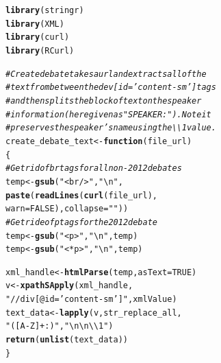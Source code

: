 \documentclass{article}\usepackage[]{graphicx}\usepackage[]{color}
\makeatletter
\newcommand{\hlnum}[1]{\textcolor[rgb]{0.686,0.059,0.569}{#1}}%
\newcommand{\hlstr}[1]{\textcolor[rgb]{0.192,0.494,0.8}{#1}}%
\newcommand{\hlcom}[1]{\textcolor[rgb]{0.678,0.584,0.686}{\textit{#1}}}%
\newcommand{\hlstd}[1]{\textcolor[rgb]{0.345,0.345,0.345}{#1}}%
\newcommand{\hlkwa}[1]{\textcolor[rgb]{0.161,0.373,0.58}{\textbf{#1}}}%
\newcommand{\hlkwb}[1]{\textcolor[rgb]{0.69,0.353,0.396}{#1}}%
\newcommand{\hlkwc}[1]{\textcolor[rgb]{0.333,0.667,0.333}{#1}}%
\newcommand{\hlkwd}[1]{\textcolor[rgb]{0.737,0.353,0.396}{\textbf{#1}}}%
\newenvironment{kframe}{%
 \def\at@end@of@kframe{}%
 \ifinner\ifhmode%
  \def\at@end@of@kframe{\end{minipage}}%
  \begin{minipage}{\columnwidth}%
 \fi\fi%
 \def\FrameCommand##1{\hskip\@totalleftmargin \hskip-\fboxsep
 \colorbox{shadecolor}{##1}\hskip-\fboxsep
     \hskip-\linewidth \hskip-\@totalleftmargin \hskip\columnwidth}%
 \MakeFramed {\advance\hsize-\width
   \@totalleftmargin\z@ \linewidth\hsize
   \@setminipage}}%
 {\par\unskip\endMakeFramed%
 \at@end@of@kframe}
\newenvironment{knitrout}{}{} %
\makeatother
\begin{document}
\begin{knitrout}
\color{fgcolor}\begin{kframe}
\begin{alltt}
\hlkwd{library}\hlstd{(stringr)}
\hlkwd{library}\hlstd{(XML)}
\hlkwd{library}\hlstd{(curl)}
\hlkwd{library}\hlstd{(RCurl)}
\end{alltt}


{\ttfamily\noindent\itshape\color{messagecolor}{\#\# Loading required package: bitops}}\begin{alltt}
\hlcom{# Create debate takes a url and extracts all of the }
\hlcom{# text from between the dev[id = 'content-sm'] tags}
\hlcom{# and then splits the block of text on the speaker}
\hlcom{# information (here given as "SPEAKER: ").  Note it }
\hlcom{# preserves the speaker's name using the \textbackslash{}\textbackslash{}1 value.}
\hlstd{create_debate_text} \hlkwb{<-} \hlkwa{function}\hlstd{(}\hlkwc{file_url}\hlstd{)}
\hlstd{\{}
  \hlcom{# Get rid of br tags for all non-2012 debates}
  \hlstd{temp} \hlkwb{<-} \hlkwd{gsub}\hlstd{(}\hlstr{"<br/>"}\hlstd{,}\hlstr{"\textbackslash{}n"}\hlstd{,}
               \hlkwd{paste}\hlstd{(}\hlkwd{readLines}\hlstd{(}\hlkwd{curl}\hlstd{(file_url),}
               \hlkwc{warn} \hlstd{=} \hlnum{FALSE}\hlstd{),}\hlkwc{collapse}\hlstd{=}\hlstr{""}\hlstd{))}
  \hlcom{# Get ride of p tags for the 2012 debate}
  \hlstd{temp} \hlkwb{<-} \hlkwd{gsub}\hlstd{(}\hlstr{"<p>"}\hlstd{,}\hlstr{"\textbackslash{}n"}\hlstd{,temp)}
  \hlstd{temp} \hlkwb{<-} \hlkwd{gsub}\hlstd{(}\hlstr{"<*p>"}\hlstd{,}\hlstr{"\textbackslash{}n"}\hlstd{,temp)}

  \hlstd{xml_handle} \hlkwb{<-} \hlkwd{htmlParse}\hlstd{(temp,} \hlkwc{asText}\hlstd{=}\hlnum{TRUE}\hlstd{)}
  \hlstd{v} \hlkwb{<-} \hlkwd{xpathSApply}\hlstd{(xml_handle,}
                   \hlstr{"//div[@id = 'content-sm']"}\hlstd{,xmlValue)}
  \hlstd{text_data} \hlkwb{<-} \hlkwd{lapply}\hlstd{(v,str_replace_all,}
                      \hlstr{"([A-Z]+:)"}\hlstd{,}\hlstr{"\textbackslash{}n\textbackslash{}n\textbackslash{}\textbackslash{}1"}\hlstd{)}
  \hlkwd{return}\hlstd{(}\hlkwd{unlist}\hlstd{(text_data))}
\hlstd{\}}


\end{alltt}
\end{kframe}
\end{knitrout}
\end{document}
